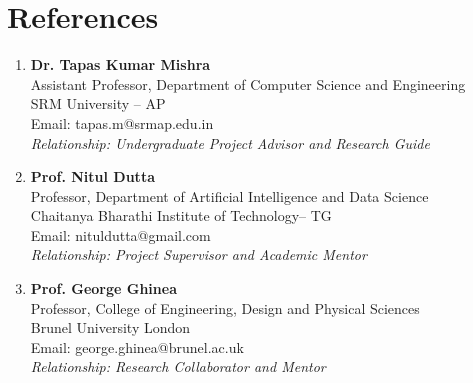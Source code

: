 \documentclass[a4paper,11pt]{article}
\newcommand{\socialicon}[1]{\raisebox{-0.05em}{\resizebox{!}{1em}{#1}}}
\begin{document}
\begin{comment}
\section{\textbf{Coding Platforms}}
\vspace{-0.2mm}
\small{
\begin{itemize}[leftmargin=*,labelsep=2mm]
  \item \faCode \ \textbf{CodeChef:} \href{https://www.codechef.com/users/sai14karthik}{\textcolor{darkblue}{sai14karthik}}
  \item \faLaptopCode \ \textbf{LeetCode:} \href{https://leetcode.com/sai14karthik}{\textcolor{darkblue}{sai14karthik}}
  \item \faBrain \ \textbf{GeeksforGeeks:} \href{https://auth.geeksforgeeks.org/user/sai14karthik}{\textcolor{darkblue}{sai14karthik}}
  \item \socialicon{\faKaggle} \ \textbf{Kaggle:} \href{https://www.kaggle.com/sai14karthik}{\textcolor{darkblue}{sai14karthik}}
\end{itemize}
}
\end{comment}

\section{\textbf{References}}
\vspace{-0.2mm}
\small{
\begin{enumerate}[leftmargin=*,labelsep=2mm]
\item \textbf{Dr. Tapas Kumar Mishra}\\
   Assistant Professor, Department of Computer Science and Engineering\\
   SRM University – AP\\
   Email: tapas.m@srmap.edu.in\\
   \textit{Relationship: Undergraduate Project Advisor and Research Guide}

\item \textbf{Prof. Nitul Dutta}\\
   Professor, Department of Artificial Intelligence and Data Science\\
   Chaitanya Bharathi Institute of Technology– TG\\
   Email: nituldutta@gmail.com\\
   \textit{Relationship: Project Supervisor and Academic Mentor}

\item \textbf{Prof. George Ghinea}\\
   Professor, College of Engineering, Design and Physical Sciences\\
   Brunel University London\\
   Email: george.ghinea@brunel.ac.uk\\
   \textit{Relationship: Research Collaborator and Mentor}

\end{enumerate}
}
\end{document}
